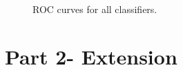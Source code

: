 \documentclass{article}
\begin{document}
\begin{figure}[H]
  \caption{ROC curves for all classifiers.}
\end{figure}

\section*{Part 2- Extension}
\end{document}
